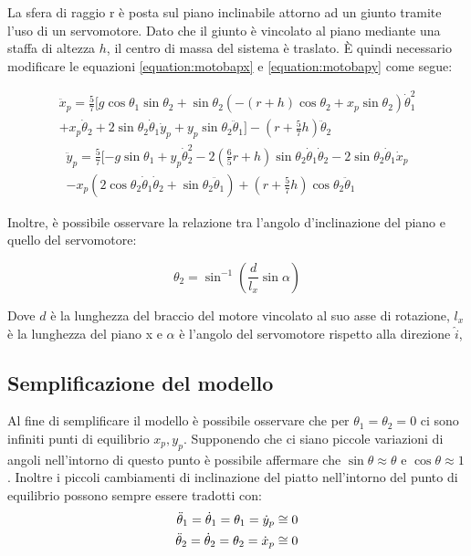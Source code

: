 La sfera di raggio r è posta sul piano inclinabile attorno ad un giunto tramite l'uso di un servomotore. Dato che il giunto è vincolato al piano mediante una staffa di altezza $h$, il centro di massa del sistema è traslato. È quindi necessario modificare le equazioni \ref{equation:motobapx} e \ref{equation:motobapy} come segue:

\begin{equation}
\begin{split}
\ddot{x}_{p}=\frac{5}{7}[g\cos\theta_{1}\sin\theta_{2}+\sin\theta_{2}(-(r+h)\cos\theta_{2}+x_{p}\sin\theta_{2})\dot{\theta}_{1}^2	\\
+x_{p}\dot{\theta}_{2}+2\sin\theta_{2}\dot{\theta}_{1}\dot{y}_{p}+y_{p}\sin\theta_{2}\ddot{\theta}_{1}]-(r+\frac{5}{7}h)\ddot{\theta}_{2}
\end{split}
\label{equation:motobapxmod}
\end{equation}
\begin{equation}
\begin{split}
\ddot{y}_{p}=\frac{5}{7}[-g\sin\theta_{1}+y_{p}\dot{\theta}_{2}^2-2(\frac{6}{5}r+h)\sin\theta_{2}\dot{\theta}_{1}\dot{\theta}_{2}-2\sin\theta_{2}\dot{\theta}_{1}\dot{x}_{p}	\\
-x_{p}(2\cos\theta_{2}\dot{\theta}_{1}\dot{\theta}_{2}+\sin\theta_{2}\ddot{\theta}_{1})+(r+\frac{5}{7}h)\cos\theta_{2}\ddot{\theta}_{1}
\end{split}
\label{equation:motobapymod}
\end{equation}

Inoltre, è possibile osservare la relazione tra l'angolo d'inclinazione del piano e quello del servomotore:

\begin{equation}
\theta_{2}=\sin^{-1}(\frac{d}{l_{x}}\sin\alpha)
\label{equation:approximation}
\end{equation} 

Dove $d$ è la lunghezza del braccio del motore vincolato al suo asse di rotazione, $l_{x}$ è la lunghezza del piano x e $\alpha$ è l'angolo del servomotore rispetto alla direzione $\hat{i}$,

\subsection{Semplificazione del modello}

Al fine di semplificare il modello è possibile osservare che per $\theta_{1}=\theta_{2}=0$ ci sono infiniti punti di equilibrio $x_{p},y_{p}$. Supponendo che ci siano piccole variazioni di angoli nell'intorno di questo punto è possibile affermare che $\sin\theta\approx\theta$ e $\cos\theta\approx1$. Inoltre i piccoli cambiamenti di inclinazione del piatto nell'intorno del punto di equilibrio possono sempre essere tradotti con:
\begin{align}
	\centering
	\ddot{\theta}_{1}=\dot{\theta}_{1}=\theta_{1}=\dot{y}_{p} &\cong0 \\
	\ddot{\theta}_{2}=\dot{\theta}_{2}=\theta_{2}=\dot{x}_{p} &\cong0
\end{align}


